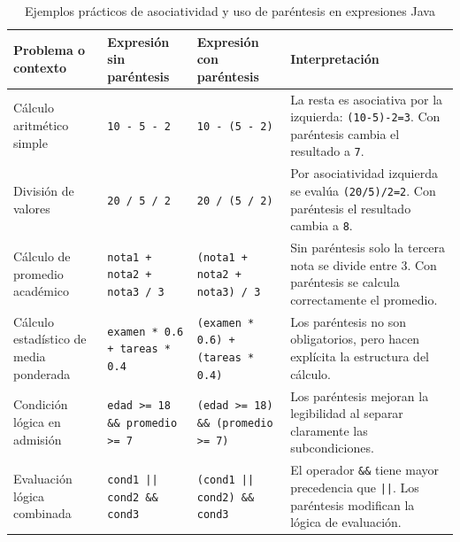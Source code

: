 \documentclass[12pt,twoside]{book}
\begin{document}
						\begin{table}[H]
							\centering
							\caption{Ejemplos prácticos de asociatividad y uso de paréntesis en expresiones Java}
							\label{tab:asociatividad_parentesis}
							\footnotesize
							
							\begin{tabularx}{\textwidth}{
									>{\raggedright\arraybackslash}X
									>{\raggedright\arraybackslash}X
									>{\raggedright\arraybackslash}X
									>{\raggedright\arraybackslash}X}
								
								\toprule
								\textbf{Problema o contexto} &
								\textbf{Expresión sin paréntesis} &
								\textbf{Expresión con paréntesis} &
								\textbf{Interpretación} \\
								
								\midrule
								
								Cálculo aritmético simple &
								\texttt{10 - 5 - 2} &
								\texttt{10 - (5 - 2)} &
								La resta es asociativa por la izquierda: \texttt{(10-5)-2=3}. Con paréntesis cambia el resultado a \texttt{7}. \\
								
								División de valores &
								\texttt{20 / 5 / 2} &
								\texttt{20 / (5 / 2)} &
								Por asociatividad izquierda se evalúa \texttt{(20/5)/2=2}. Con paréntesis el resultado cambia a \texttt{8}. \\
								
								Cálculo de promedio académico &
								\texttt{nota1 + nota2 + nota3 / 3} &
								\texttt{(nota1 + nota2 + nota3) / 3} &
								Sin paréntesis solo la tercera nota se divide entre 3. Con paréntesis se calcula correctamente el promedio. \\
								
								Cálculo estadístico de media ponderada &
								\texttt{examen * 0.6 + tareas * 0.4} &
								\texttt{(examen * 0.6) + (tareas * 0.4)} &
								Los paréntesis no son obligatorios, pero hacen explícita la estructura del cálculo. \\
								
								Condición lógica en admisión &
								\texttt{edad >= 18 \&\& promedio >= 7} &
								\texttt{(edad >= 18) \&\& (promedio >= 7)} &
								Los paréntesis mejoran la legibilidad al separar claramente las subcondiciones. \\
								
								Evaluación lógica combinada &
								\texttt{cond1 || cond2 \&\& cond3} &
								\texttt{(cond1 || cond2) \&\& cond3} &
								El operador \texttt{\&\&} tiene mayor precedencia que \texttt{||}. Los paréntesis modifican la lógica de evaluación. \\
								

\end{tabularx}
\end{table}
\end{document}

